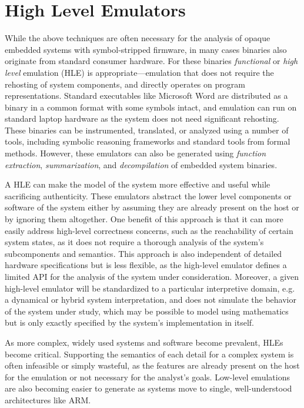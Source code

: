 \section{High Level Emulators}
\label{sec:highlevel}

While the above techniques are often necessary for the analysis of opaque embedded systems with symbol-stripped firmware, in many cases binaries also originate from standard consumer hardware.
For these binaries \emph{functional} or \emph{high level} emulation (HLE) is appropriate---emulation that does not require the rehosting of system components, and directly operates on program representations.
Standard executables like Microsoft Word are distributed as a binary in a common format with some symbols intact, and emulation can run on standard laptop hardware as the system does not need significant rehosting.
These binaries can be instrumented, translated, or analyzed using a number of tools, including symbolic reasoning frameworks and standard tools from formal methods.
However, these emulators can also be generated using \emph{function extraction}, \emph{summarization}, and \emph{decompilation} of embedded system binaries.

A HLE can make the model of the system more effective and useful while sacrificing authenticity.
These emulators abstract the lower level components or software of the system either by assuming they are already present on the host or by ignoring them altogether.
One benefit of this approach is that it can more easily address high-level correctness concerns, such as the reachability of certain system states, as it does not require a thorough analysis of the system's subcomponents and semantics.
This approach is also independent of detailed hardware specifications but is less flexible, as the high-level emulator defines a limited API for the analysis of the system under consideration.
Moreover, a given high-level emulator will be standardized to a particular interpretive domain, e.g. a dynamical or hybrid system interpretation, and does not simulate the behavior of the system under study, which may be possible to model using mathematics but is only exactly specified by the system's implementation in itself.

As more complex, widely used systems and software become prevalent, HLEs become critical.
Supporting the semantics of each detail for a complex system is often infeasible or simply wasteful, as the features are already present on the host for the emulation or not necessary for the analyst's goals.
Low-level emulations are also becoming easier to generate as systems move to single, well-understood architectures like ARM.

